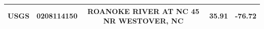 \documentclass[12pt,]{article}
\begin{document}
\begin{longtable}[]{@{}ccccc@{}}
\begin{minipage}[t]{0.10\columnwidth}
USGS\strut
\end{minipage} & \begin{minipage}[t]{0.15\columnwidth}\centering\strut
0208114150\strut
\end{minipage} & \begin{minipage}[t]{0.36\columnwidth}\centering\strut
ROANOKE RIVER AT NC 45 NR WESTOVER, NC\strut
\end{minipage} & \begin{minipage}[t]{0.12\columnwidth}\centering\strut
35.91\strut
\end{minipage} & \begin{minipage}[t]{0.12\columnwidth}\centering\strut
-76.72\strut
\end{minipage}\tabularnewline
\bottomrule
\end{longtable}
\end{document}

